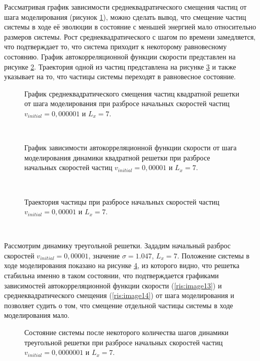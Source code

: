 \documentclass[14pt,a4paper,report]{ncc}
\begin{document}
Рассматривая график зависимости среднеквадратического смещения частиц от шага моделирования (рисунок \ref{ris:image9}), можно сделать вывод, что смещение частиц системы в ходе её эволюции в состояние с меньшей энергией мало относительно размеров системы. Рост среднеквадратического с шагом по времени замедляется, что подтверждает то, что система приходит к некоторому равновесному состоянию. 
График автокорреляционной функции скорости представлен на рисунке \ref{ris:image10}. Траектория одной из частиц представлена на рисунке \ref{ris:image11} и также указывает на то, что частицы системы переходят в равновесное состояние.
\

\begin{figure}[h!]
\caption{График среднеквадратического смещения частиц квадратной решетки от шага моделирования при разбросе начальных скоростей частиц  $v_{initial} = 0,000001 $ и  $L_x=7$.}
\label{ris:image9}
\end{figure}
\


\begin{figure}[h!]
\caption{График зависимости автокорреляционной функции скорости от шага моделирования динамики квадратной решетки при разбросе начальных скоростей частиц $v_{initial} = 0,00001 $ и  $L_x=7$.}
\label{ris:image10}
\end{figure}
\

\begin{figure}[tbp]
\caption{Траектория частицы при разбросе начальных скоростей частиц $v_{initial} = 0,00001 $ и  $L_x=7$.}
\label{ris:image11}
\end{figure}
\



Рассмотрим динамику треугольной решетки. Зададим начальный разброс скоростей  $v_{initial} = 0,00001 $, значение $\sigma = 1.047$, $L_x = 7$. Положение системы в ходе моделирования показано на рисунке \ref{ris:image12}, из которого видно, что решетка стабильна именно в таком состоянии, что подтверждается графиками зависимостей автокорреляционной функции скорости (\ref{ris:image13}) и среднеквадратического смещения (\ref{ris:image14}) от шага моделирования и позволяет судить о том, что смещение отдельной частицы системы в ходе моделирования мало.
\

\begin{figure}[tbp]
\caption{Состояние системы после некоторого количества шагов динамики треугольной решетки при разбросе начальных скоростей частиц $v_{initial} = 0,0000001 $ и   $L_x=7$.}
\label{ris:image12}
\end{figure}
\
\end{document}
